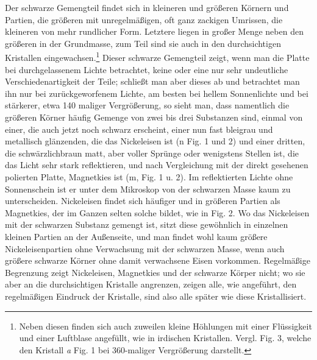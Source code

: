 \documentclass[a4paper, 11pt, oneside]{article}
\begin{document}
Der schwarze Gemengteil findet sich in kleineren und größeren Körnern und Partien, die größeren mit unregelmäßigen, oft ganz zackigen Umrissen, die kleineren von mehr rundlicher Form. Letztere liegen in großer Menge neben den größeren in der Grundmasse, zum Teil sind sie auch in den durchsichtigen Kristallen eingewachsen.\footnote{Neben diesen finden sich auch zuweilen kleine Höhlungen mit einer Flüssigkeit und einer Luftblase angefüllt, wie in irdischen Kristallen. Vergl. Fig. 3, welche den Kristall \emph{a} Fig. 1 bei 360-maliger Vergrößerung darstellt.} Dieser schwarze Gemengteil zeigt, wenn man die Platte bei durchgelassenem Lichte betrachtet, keine oder eine nur sehr undeutliche Verschiedenartigkeit der Teile; schließt man aber dieses ab und betrachtet man ihn nur bei zurückgeworfenem Lichte, am besten bei hellem Sonnenlichte und bei stärkerer, etwa 140 maliger Vergrößerung, so sieht man, dass namentlich die größeren Körner häufig Gemenge von zwei bis drei Substanzen sind, einmal von einer, die auch jetzt noch schwarz erscheint, einer nun fast bleigrau und metallisch glänzenden, die das Nickeleisen ist (n Fig. 1 und 2) und einer dritten, die schwärzlichbraun matt, aber voller Sprünge oder wenigstens Stellen ist, die das Licht sehr stark reflektieren, und nach Vergleichung mit der direkt gesehenen polierten Platte, Magnetkies ist (m, Fig. 1 u. 2). Im reflektierten Lichte ohne Sonnenschein ist er unter dem Mikroskop von der schwarzen Masse kaum zu unterscheiden. Nickeleisen findet sich häufiger und in größeren Partien als Magnetkies, der im Ganzen selten solche bildet, wie in Fig. 2. Wo das Nickeleisen mit der schwarzen Substanz gemengt ist, sitzt diese gewöhnlich in einzelnen kleinen Partien an der Außenseite, und man findet wohl kaum größere Nickeleisenpartien ohne Verwachsung mit der schwarzen Masse, wenn auch größere schwarze Körner ohne damit verwachsene Eisen vorkommen. Regelmäßige Begrenzung zeigt Nickeleisen, Magnetkies und der schwarze Körper nicht; wo sie aber an die durchsichtigen Kristalle angrenzen, zeigen alle, wie angeführt, den regelmäßigen Eindruck der Kristalle, sind also alle später wie diese Kristallisiert.
\end{document}

